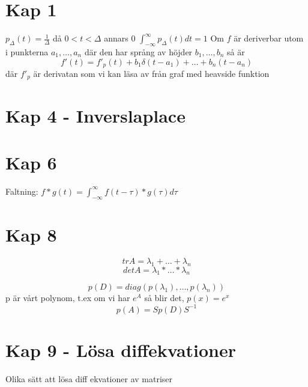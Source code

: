 \documentclass[twocolumn,a4paper]{article}
\begin{document}
\section*{Kap 1}

$p_{\Delta}(t) = \frac{1}{\Delta}$ då $0<t<\Delta$ annars 0
$\int^{\infty}_{-\infty} p_{\Delta}(t) dt = 1$
\newline
\newline
Om $f$ är deriverbar utom i punkterna $a_1, \ldots, a_n$ där den har språng av höjder $b_1,\ldots,b_n$ så är
\begin{equation}
    f'(t) = f'_p(t) + b_1\delta(t-a_1)+\ldots+b_n(t-a_n)
\end{equation}
där $f'_p$ är derivatan som vi kan läsa av från graf med heavside funktion


\section*{Kap 4 - Inverslaplace}


\section*{Kap 6}
Faltning: $f \ast g(t) = \int_{-\infty}^{\infty} f(t-\tau)*g(\tau) d\tau$

\section*{Kap 8}
\begin{equation}
    tr A = \lambda_1 + \ldots + \lambda_n    
\end{equation}
\begin{equation}
    det A = \lambda_1 * \ldots *\lambda_n    
\end{equation}


\begin{equation}
    p(D) = diag(p(\lambda_1),\ldots,p(\lambda_n))
\end{equation}
p är vårt polynom, t.ex om vi har $e^A$ så blir det, $p(x) = e^x$
\begin{equation}
    p(A) = Sp(D)S^{-1}
\end{equation}
\section*{Kap 9 - Lösa diffekvationer}
Olika sätt att lösa diff ekvationer av matriser
\end{document}
